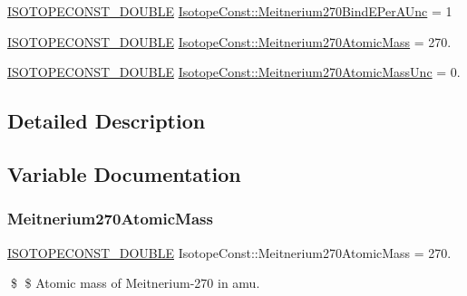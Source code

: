\begin{DoxyCompactItemize}
\mbox{\hyperlink{group___isotope_const-_macros_ga8f45a7272ce02c0b4c65c44636ed719a}{I\+S\+O\+T\+O\+P\+E\+C\+O\+N\+S\+T\+\_\+\+D\+O\+U\+B\+LE}} \mbox{\hyperlink{group___isotope_const-_meitnerium-_mt270_gaf1ec3ca1e42ed515106a4fd3f2b2a40c}{Isotope\+Const\+::\+Meitnerium270\+Bind\+E\+Per\+A\+Unc}} = 1
\item 
\mbox{\hyperlink{group___isotope_const-_macros_ga8f45a7272ce02c0b4c65c44636ed719a}{I\+S\+O\+T\+O\+P\+E\+C\+O\+N\+S\+T\+\_\+\+D\+O\+U\+B\+LE}} \mbox{\hyperlink{group___isotope_const-_meitnerium-_mt270_gadbdfbde28494169313fa3e6c992fbdd0}{Isotope\+Const\+::\+Meitnerium270\+Atomic\+Mass}} = 270.
\item 
\mbox{\hyperlink{group___isotope_const-_macros_ga8f45a7272ce02c0b4c65c44636ed719a}{I\+S\+O\+T\+O\+P\+E\+C\+O\+N\+S\+T\+\_\+\+D\+O\+U\+B\+LE}} \mbox{\hyperlink{group___isotope_const-_meitnerium-_mt270_gab564a1399aba5798d3827ecbf1a330e3}{Isotope\+Const\+::\+Meitnerium270\+Atomic\+Mass\+Unc}} = 0.
\end{DoxyCompactItemize}


\subsection{Detailed Description}


\subsection{Variable Documentation}
\mbox{\label{group___isotope_const-_meitnerium-_mt270_gadbdfbde28494169313fa3e6c992fbdd0}} 
\subsubsection{\texorpdfstring{Meitnerium270\+Atomic\+Mass}{Meitnerium270AtomicMass}}
{\footnotesize\ttfamily \mbox{\hyperlink{group___isotope_const-_macros_ga8f45a7272ce02c0b4c65c44636ed719a}{I\+S\+O\+T\+O\+P\+E\+C\+O\+N\+S\+T\+\_\+\+D\+O\+U\+B\+LE}} Isotope\+Const\+::\+Meitnerium270\+Atomic\+Mass = 270.}

\$ \$ Atomic mass of Meitnerium-\/270 in amu. \mbox{\label{group___isotope_const-_meitnerium-_mt270_gab564a1399aba5798d3827ecbf1a330e3}} 
